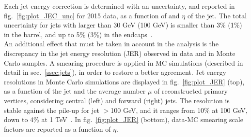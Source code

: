 \noindent Each jet energy correction is determined with an uncertainty, and reported in fig.~\ref{fig:plot_JEC_unc} for 2015 data, as a function of \pt and $\eta$ of the jet. The total uncertainty for jets with \pt larger than 30 GeV (100 GeV) is smaller than 3\% (1\%) in the barrel, and up to 5\% (3\%) in the endcaps~\cite{CMS-DP-2016-020}.\\
An additional effect that must be taken in account in the analysis is the discrepancy in the jet energy resolution (JER) observed in data and in Monte Carlo samples. A smearing procedure is applied in MC simulations (described in detail in sec.~\ref{ssec:jets}), in order to restore a better agreement. Jet energy resolutions in Monte Carlo simulations are displayed in fig.~\ref{fig:plot_JER} (top), as a function of the jet \pt and the average number $\mu$ of reconstructed primary vertices, considering central (left) and forward (right) jets. The resolution is stable against the pile-up for jet \pt$>$100 GeV, and it ranges from 10\% at 100 GeV, down to 4\% at 1 TeV~\cite{CMS-DP-2016-020}. In fig.~\ref{fig:plot_JER} (bottom), data-MC smearing scale factors are reported as a function of $\eta$.

